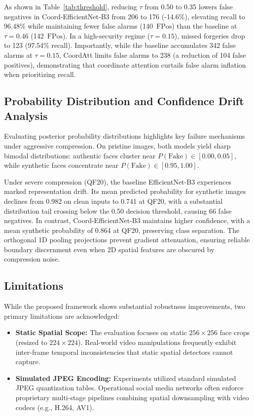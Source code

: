 \documentclass[conference]{IEEEtran}
\begin{document}
As shown in Table~\ref{tab:threshold}, reducing $\tau$ from 0.50 to 0.35 lowers false negatives in Coord-EfficientNet-B3 from 206 to 176 (-14.6\%), elevating recall to 96.48\% while maintaining fewer false alarms (140~$\text{FPos}$) than the baseline at $\tau = 0.46$ (142~$\text{FPos}$). In a high-security regime ($\tau = 0.15$), missed forgeries drop to 123 (97.54\% recall). Importantly, while the baseline accumulates 342 false alarms at $\tau = 0.15$, CoordAtt limits false alarms to 238 (a reduction of 104 false positives), demonstrating that coordinate attention curtails false alarm inflation when prioritizing recall.

\subsection{Probability Distribution and Confidence Drift Analysis}
Evaluating posterior probability distributions highlights key failure mechanisms under aggressive compression. On pristine images, both models yield sharp bimodal distributions: authentic faces cluster near $P(\text{Fake}) \in [0.00, 0.05]$, while synthetic faces concentrate near $P(\text{Fake}) \in [0.95, 1.00]$.

Under severe compression (QF20), the baseline EfficientNet-B3 experiences marked representation drift. Its mean predicted probability for synthetic images declines from 0.982 on clean inputs to 0.741 at QF20, with a substantial distribution tail crossing below the 0.50 decision threshold, causing 66 false negatives. In contrast, Coord-EfficientNet-B3 maintains higher confidence, with a mean synthetic probability of 0.864 at QF20, preserving class separation. The orthogonal 1D pooling projections prevent gradient attenuation, ensuring reliable boundary discernment even when 2D spatial features are obscured by compression noise.

\subsection{Limitations}
While the proposed framework shows substantial robustness improvements, two primary limitations are acknowledged:
\begin{itemize}
    \item \textbf{Static Spatial Scope:} The evaluation focuses on static $256 \times 256$ face crops (resized to $224 \times 224$). Real-world video manipulations frequently exhibit inter-frame temporal inconsistencies that static spatial detectors cannot capture.
    \item \textbf{Simulated JPEG Encoding:} Experiments utilized standard simulated JPEG quantization tables. Operational social media networks often enforce proprietary multi-stage pipelines combining spatial downsampling with video codecs (e.g., H.264, AV1).
\end{itemize}
\end{document}
